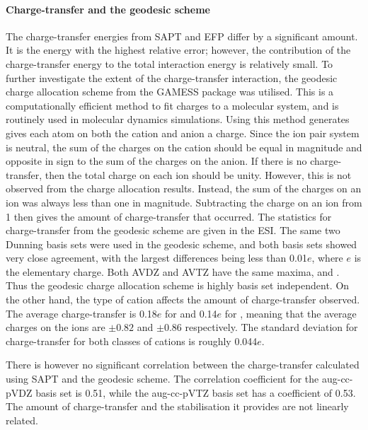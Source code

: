 
\paragraph{Charge-transfer and the geodesic scheme}
The charge-transfer energies from SAPT and EFP differ by a significant amount. 
It is the energy with the highest relative error; however, the contribution of the charge-transfer energy to the total interaction energy is relatively small.
To further investigate the extent of the charge-transfer interaction, the geodesic charge allocation scheme from the GAMESS package was utilised.
This is a computationally efficient method to fit charges to a molecular system, and is routinely used in molecular dynamics simulations.
Using this method generates gives each atom on both the cation and anion a charge. 
Since the ion pair system is neutral, the sum of the charges on the cation should be equal in magnitude and opposite in sign to the sum of the charges on the anion.
If there is no charge-transfer, then the total charge on each ion should be unity. 
However, this is not observed from the charge allocation results. 
Instead, the sum of the charges on an ion was always less than one in magnitude. 
Subtracting the charge on an ion from 1 then gives the amount of charge-transfer that occurred. 
The statistics for charge-transfer from the geodesic scheme are given in the ESI.
The same two Dunning basis sets were used in the geodesic scheme, and both basis sets showed very close agreement, with the largest differences being less than 0.01$e$, where $e$ is the elementary charge. 
Both AVDZ and AVTZ have the same maxima,  and .
Thus the geodesic charge allocation scheme is highly basis set independent. 
On the other hand, the type of cation affects the amount of charge-transfer observed.
The average charge-transfer is 0.18$e$ for  and 0.14$e$ for , meaning that the average charges on the ions are $\pm 0.82$ and $\pm 0.86$ respectively.
The standard deviation for charge-transfer for both classes of cations is roughly 0.044$e$.



There is however no significant correlation between the charge-transfer calculated using SAPT and the geodesic scheme. 
The correlation coefficient for the aug-cc-pVDZ basis set is 0.51, while the aug-cc-pVTZ basis set has a coefficient of 0.53. %
The amount of charge-transfer and the stabilisation it provides are not linearly related.


